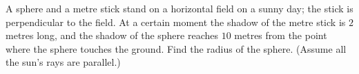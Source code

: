 A sphere and a metre stick stand on a horizontal field on a sunny day; the stick is perpendicular to the field. At a certain moment the shadow of the metre stick is $2$ metres long, and the shadow of the sphere reaches $10$ metres from the point where the sphere touches the ground. Find the radius of the sphere. (Assume all the sun's rays are parallel.)
